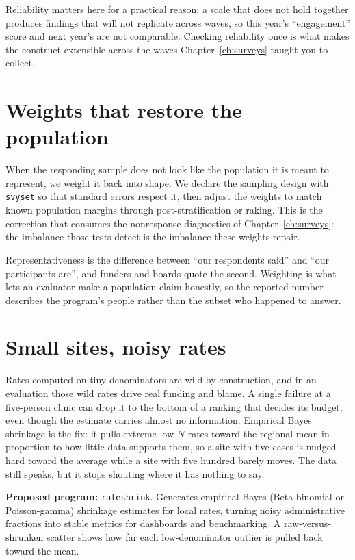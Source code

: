 \documentclass[
    a4paper,
    fontsize=10pt,
    twoside=true,
    numbers=noenddot,
]{kaobook}
\begin{document}
Reliability matters here for a practical reason: a scale that does not hold together produces findings that will not replicate across waves, so this year's \enquote{engagement} score and next year's are not comparable. Checking reliability once is what makes the construct extensible across the waves Chapter~\ref{ch:surveys} taught you to collect.

\section{Weights that restore the population}\label{sec:weights}
When the responding sample does not look like the population it is meant to represent, we weight it back into shape. We declare the sampling design with \texttt{svyset} so that standard errors respect it, then adjust the weights to match known population margins through post-stratification or raking. This is the correction that consumes the nonresponse diagnostics of Chapter~\ref{ch:surveys}: the imbalance those tests detect is the imbalance these weights repair.

Representativeness is the difference between \enquote{our respondents said} and \enquote{our participants are}, and funders and boards quote the second. Weighting is what lets an evaluator make a population claim honestly, so the reported number describes the program's people rather than the subset who happened to answer.

\section{Small sites, noisy rates}\label{sec:shrink}
Rates computed on tiny denominators are wild by construction, and in an evaluation those wild rates drive real funding and blame. A single failure at a five-person clinic can drop it to the bottom of a ranking that decides its budget, even though the estimate carries almost no information. Empirical Bayes shrinkage is the fix: it pulls extreme low-$N$ rates toward the regional mean in proportion to how little data supports them, so a site with five cases is nudged hard toward the average while a site with five hundred barely moves. The data still speaks, but it stops shouting where it has nothing to say.

\begin{kaobox}[frametitle=Ado-file Idea: \texttt{rateshrink}]
\textbf{Proposed program:} \texttt{rateshrink}. Generates empirical-Bayes (Beta-binomial or Poisson-gamma) shrinkage estimates for local rates, turning noisy administrative fractions into stable metrics for dashboards and benchmarking. A raw-versus-shrunken scatter shows how far each low-denominator outlier is pulled back toward the mean.
\end{kaobox}
\end{document}
